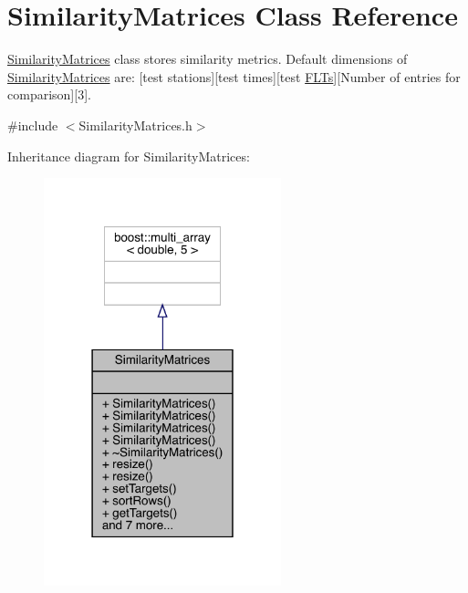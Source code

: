 \hypertarget{class_similarity_matrices}{}\section{Similarity\+Matrices Class Reference}
\label{class_similarity_matrices}


\mbox{\hyperlink{class_similarity_matrices}{Similarity\+Matrices}} class stores similarity metrics. Default dimensions of \mbox{\hyperlink{class_similarity_matrices}{Similarity\+Matrices}} are\+: \mbox{[}test stations\mbox{]}\mbox{[}test times\mbox{]}\mbox{[}test \mbox{\hyperlink{class_f_l_ts}{F\+L\+Ts}}\mbox{]}\mbox{[}Number of entries for comparison\mbox{]}\mbox{[}3\mbox{]}.  




{\ttfamily \#include $<$Similarity\+Matrices.\+h$>$}



Inheritance diagram for Similarity\+Matrices\+:
\nopagebreak
\begin{figure}[H]
\begin{center}
\leavevmode
\includegraphics[width=195pt]{class_similarity_matrices__inherit__graph}
\end{center}
\end{figure}



